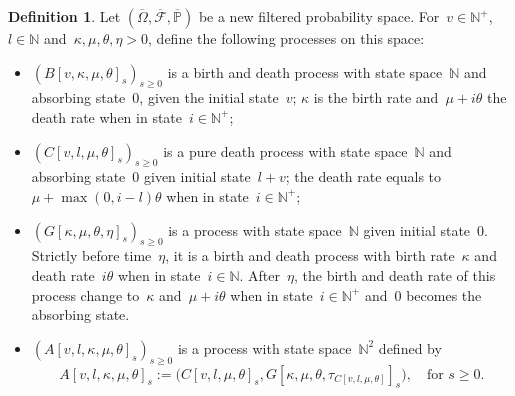 \documentclass{amsart}[11pt]
\numberwithin{equation}{section}
\theoremstyle{definition}
\newtheorem{definition}[theorem]{Definition}
\newcommand{\PP}{\mathbb{P}}
\newcommand{\NN}{\mathbb{N}}
\newcommand{\Ff}{\mathcal{F}}
\begin{document}
\begin{definition}\label{def:bdprocesses}
Let $(\overline{\Omega}, \overline{\Ff}, \overline{\PP})$ be a new filtered probability space.
For~$v\in\NN^+$, $l\in\NN$ and~$\kappa, \mu, \theta,\eta >0$, define the following processes on
this space:
\begin{itemize}
\item $\left(B[v, \kappa, \mu, \theta]_s\right)_{s\geq 0}$
is a birth and death process with state space~$\NN$ and absorbing state~$0$, 
given the initial state~$v$;
$\kappa$ is the birth rate and~$\mu+i\theta$ the death rate when in state~$i\in\NN^+$;
\item $\left(C[v, l, \mu, \theta]_s\right)_{s\geq0}$ 
is a pure death process with state space~$\NN$ and absorbing state~$0$
given initial state~$l+v$;
the death rate equals to~$\mu+\max(0, i-l)\theta$ when in state~$i \in\NN^+$;
\item$\left(G[\kappa, \mu, \theta, \eta]_s\right)_{s\geq0}$ is a process with state space~$\NN$
given initial state~$0$. 
Strictly before time~$\eta$,
it is a birth and death process with birth rate~$\kappa$ and death rate~$i\theta$ when in state~$i\in\NN$.
After~$\eta$,
the birth and death rate of this process change to~$\kappa$ and~$\mu + i\theta$ when in state~$i\in\NN^+$ and~$0$ becomes the absorbing state.
\item
$\left(A[v, l, \kappa, \mu, \theta]_s\right)_{s\geq0}$ is a process with state space~$\NN^2$ defined by
$$
A[v, l, \kappa, \mu, \theta]_s := \big(C[v, l, \mu, \theta]_s, G[\kappa, \mu, \theta, \tau_{C[v, l, \mu, \theta]}]_s\big),
\quad\textrm{for $s\geq0$}.
$$
\end{itemize}
\end{definition}
\end{document}
